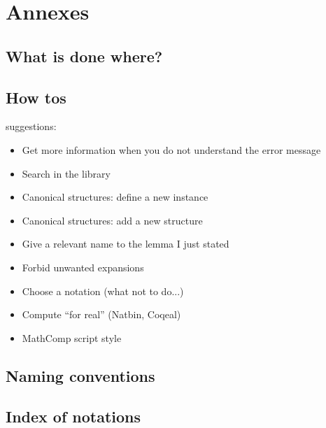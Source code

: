 \documentclass{book}
\begin{document}
\part{Annexes}

\chapter{What is done where?}

\chapter{How tos}
suggestions:
\begin{itemize}
\item Get more information when you do not understand the error
  message
\item Search in the library
\item Canonical structures: define a new instance
\item Canonical structures: add a new structure
\item Give a relevant name to the lemma I just stated
\item Forbid unwanted expansions
\item Choose a notation (what not to do...)
\item Compute ``for real'' (Natbin, Coqeal)
\item MathComp script style
\end{itemize}
\chapter{Naming conventions}

\chapter{Index of notations}



\end{document}
